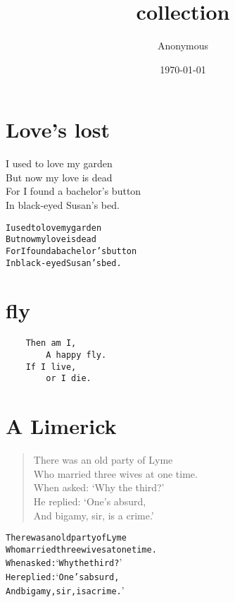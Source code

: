 \documentclass[a5paper]{report}
\title{collection}
\author{Anonymous}
\date{\today}
\newcommand{\garden}{
I used to love my garden \\
But now my love is dead \\
For I found a bachelor’s button \\
In black-eyed Susan’s bed.
}
\begin{document}
\maketitle
\newpage
\tableofcontents
\newpage



\section{Love’s lost}
\garden
\newpage

\begin{alltt}\normalfont
I used to love my garden
But now my love is dead
For I found a bachelor’s button
In black-eyed Susan’s bed.
\end{alltt}
\newpage

\section{fly}
\begin{lstlisting}
    Then am I,
        A happy fly.
    If I live,
        or I die.
\end{lstlisting}
\newpage

\section{A Limerick}
\begin{verse}
There was an old party of Lyme \\
Who married three wives at one time. \\
\hspace{2em} When asked: ‘Why the third?’ \\
\hspace{2em} He replied: ‘One’s absurd, \\
And bigamy, sir, is a crime.’
\end{verse}
\newpage

\begin{alltt}\normalfont
There was an old party of Lyme
Who married three wives at one time.
     When asked: ‘Why the third?’
     He replied: ‘One’s absurd,
And bigamy, sir, is a crime.’
\end{alltt}
\newpage
\end{document}
